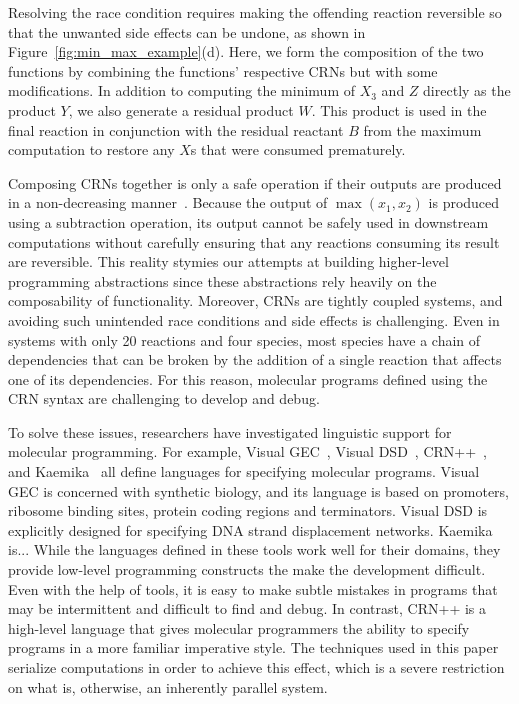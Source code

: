 Resolving the race condition requires making the offending reaction reversible so that the unwanted side effects can be undone, as shown in Figure~\ref{fig:min_max_example}(d).
Here, we form the composition of the two functions by combining the functions' respective CRNs but with some modifications.
In addition to computing the minimum of $X_3$ and $Z$ directly as the product $Y$, we also generate a residual product $W$.
This product is used in the final reaction in conjunction with the residual reactant $B$ from the maximum computation to restore any $X$s that were consumed prematurely.

Composing CRNs together is only a safe operation if their outputs are produced in a non-decreasing manner~\cite{jCKRS18,doty19}.
Because the output of \( \max(x_1, x_2) \) is produced using a subtraction operation, its output cannot be safely used in downstream computations without carefully ensuring that any reactions consuming its result are reversible.
This reality stymies our attempts at building higher-level programming abstractions since these abstractions rely heavily on the composability of functionality.
Moreover, CRNs are tightly coupled systems, and avoiding such unintended race conditions and side effects is challenging.
Even in systems with only 20 reactions and four species, most species have a chain of dependencies that can be broken by the addition of a single reaction that affects one of its dependencies.
For this reason, molecular programs defined using the CRN syntax are challenging to develop and debug.

To solve these issues, researchers have investigated linguistic support for molecular programming.
For example, Visual GEC~\cite{jPedPhi09}, Visual DSD~\cite{jLYPEP11}, CRN++~\cite{Vasic2020}, and Kaemika~\cite{cardelliKaemika} all define languages for specifying molecular programs.
Visual GEC is concerned with synthetic biology, and its language is based on promoters, ribosome binding sites, protein coding regions and terminators.
Visual DSD is explicitly designed for specifying DNA strand displacement networks.
Kaemika is...
While the languages defined in these tools work well for their domains, they provide low-level programming constructs the make the development difficult.
Even with the help of tools, it is easy to make subtle mistakes in programs that may be intermittent and difficult to find and debug.
In contrast, CRN++ is a high-level language that gives molecular programmers the ability to specify programs in a more familiar imperative style.
The techniques used in this paper serialize computations in order to achieve this effect, which is a severe restriction on what is, otherwise, an inherently parallel system.

